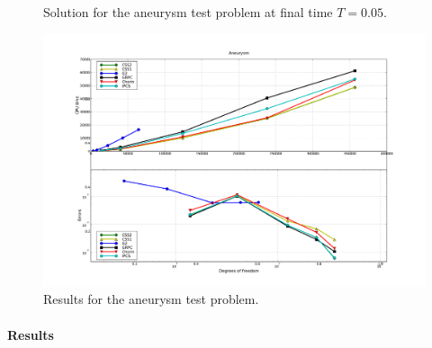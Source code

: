 \begin{figure}[htbp]
  \begin{center}
    \caption{Solution for the aneurysm test problem at final time $T = 0.05$.}
    \label{fig:aneurysm}
  \end{center}
\end{figure}

\begin{figure}
  \begin{center}
    \includegraphics[width=14cm]{chapters/kvs-1/pdf/new_aneurysm_res.pdf}
    \caption{Results for the aneurysm test problem.}
    \label{fig:aneurysm_res}
  \end{center}
\end{figure}

\paragraph{Results}


